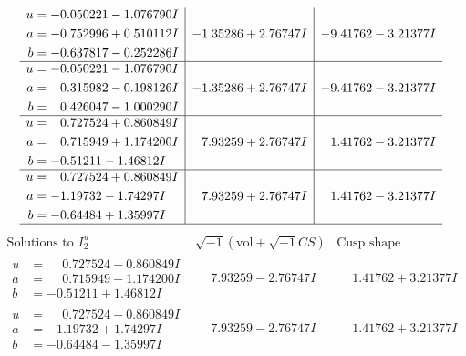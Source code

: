 \documentclass[1p]{elsarticle_modified}
\theoremstyle{definition}
\newcommand{\I}{\sqrt{-1}}
\begin{document}
$$\begin{array}{c|c|c}
\begin{aligned}
u &= -0.050221 - 1.076790 I \\
a &= -0.752996 + 0.510112 I \\
b &= -0.637817 - 0.252286 I\end{aligned}
 & -1.35286 + 2.76747 I & -9.41762 - 3.21377 I \\ \hline\begin{aligned}
u &= -0.050221 - 1.076790 I \\
a &= \phantom{-}0.315982 - 0.198126 I \\
b &= \phantom{-}0.426047 - 1.000290 I\end{aligned}
 & -1.35286 + 2.76747 I & -9.41762 - 3.21377 I \\ \hline\begin{aligned}
u &= \phantom{-}0.727524 + 0.860849 I \\
a &= \phantom{-}0.715949 + 1.174200 I \\
b &= -0.51211 - 1.46812 I\end{aligned}
 & \phantom{-}7.93259 + 2.76747 I & \phantom{-}1.41762 - 3.21377 I \\ \hline\begin{aligned}
u &= \phantom{-}0.727524 + 0.860849 I \\
a &= -1.19732 - 1.74297 I \\
b &= -0.64484 + 1.35997 I\end{aligned}
 & \phantom{-}7.93259 + 2.76747 I & \phantom{-}1.41762 - 3.21377 I\\
 \hline 
 \end{array}$$\newpage$$\begin{array}{c|c|c}  
\text{Solutions to }I^u_{2}& \I (\text{vol} + \sqrt{-1}CS) & \text{Cusp shape}\\
 \hline 
\begin{aligned}
u &= \phantom{-}0.727524 - 0.860849 I \\
a &= \phantom{-}0.715949 - 1.174200 I \\
b &= -0.51211 + 1.46812 I\end{aligned}
 & \phantom{-}7.93259 - 2.76747 I & \phantom{-}1.41762 + 3.21377 I \\ \hline\begin{aligned}
u &= \phantom{-}0.727524 - 0.860849 I \\
a &= -1.19732 + 1.74297 I \\
b &= -0.64484 - 1.35997 I\end{aligned}
 & \phantom{-}7.93259 - 2.76747 I & \phantom{-}1.41762 + 3.21377 I \\ \hline\begin{aligned}

\end{aligned}
\end{array}$$
\end{document}
